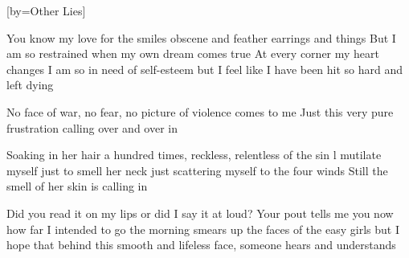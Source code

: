 [by={Other Lies}]

  \chordsoff
  \beginverse
  You know my love for the smiles obscene and feather earrings and things
  But I am so restrained when my own dream comes true
  At every corner my heart changes I am so in need of self-esteem but I feel like
  I have been hit so hard and left dying 
  \endverse

  \beginverse
  No face of war, no fear, no picture of violence comes to me 
  Just this very pure frustration calling over and over in
  \endverse

  \beginverse
  Soaking in her hair a hundred times, reckless, relentless of the sin
  l mutilate myself just to smell her neck
  just scattering myself to the four winds
  Still the smell of her skin is calling in
  \endverse

  \beginverse
  Did you read it on my lips or did I say it at loud?
  Your pout tells me you now how far I intended to go
  the morning smears up the faces of the easy girls
  but I hope that behind this smooth and lifeless face,
  someone hears and understands
  \endverse
\endsong
